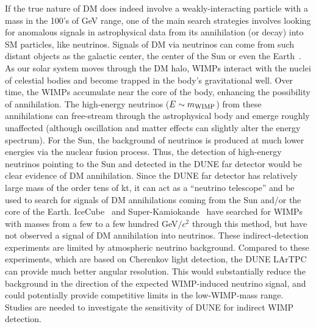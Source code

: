 If the true nature of DM does indeed involve a weakly-interacting particle with a mass in the 100's of GeV range, one of the main search strategies involves looking for anomalous signals in astrophysical data from its annihilation (or decay) into SM particles, like neutrinos. Signals of DM via neutrinos can come from such distant objects as the galactic center, the center of the Sun or even the Earth~\cite{Press:1985ug,Silk:1985ax,Gaisser:1986ha,Gould:1987ir,Cirelli:2005gh}. As our solar system moves through the DM halo, WIMPs interact with the nuclei of celestial bodies and become trapped in the body's gravitational well.  Over time, the WIMPs accumulate near the core of the body, enhancing the possibility of annihilation. The high-energy neutrinos ($E\sim m_{\rm WIMP}$) from these annihilations can free-stream through the astrophysical body and emerge roughly unaffected (although oscillation and matter effects can slightly alter the energy spectrum).  For the Sun, the background of neutrinos is produced at much lower energies via the nuclear fusion process. Thus, the detection of high-energy neutrinos pointing to the Sun and detected in the DUNE far detector would be clear evidence of DM annihilation.  Since the DUNE far detector has relatively large mass of the order tens of kt, it can act as a ``neutrino telescope'' and be used to search for signals of DM annihilations coming from the Sun and/or the core of the Earth. IceCube~\cite{Aartsen:2012kia} and Super-Kamiokande~\cite{Choi:2015ara} have searched for WIMPs with masses from a few to a few hundred GeV$/c^2$ through this method, but have not observed a signal of DM annihilation into neutrinos.  These indirect-detection experiments  are limited by atmospheric neutrino background.  Compared to these experiments, which are based on Cherenkov light detection, the DUNE LArTPC can provide much better angular resolution. This would substantially reduce the background in the direction of the  expected WIMP-induced neutrino signal, and could potentially provide competitive limits in the low-WIMP-mass range.  Studies are needed to investigate the sensitivity of DUNE for indirect WIMP detection.

